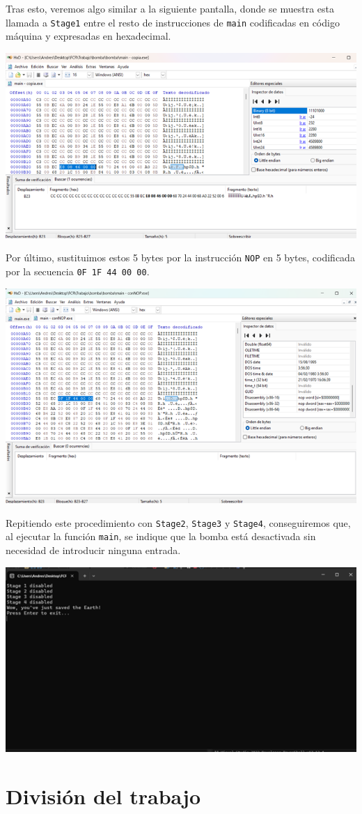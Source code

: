 \documentclass[11pt,a4paper]{article}
\begin{document}
Tras esto, veremos algo similar a la siguiente pantalla, donde se muestra
esta llamada a \texttt{Stage1} entre el resto de instrucciones de \texttt{main}
codificadas en código máquina y expresadas en hexadecimal.
\begin{center}
  \includegraphics[width=\textwidth]{Modificacion/img3.png}
\end{center}

\noindent Por último, sustituimos estos 5 bytes por la instrucción \texttt{NOP}
en 5 bytes, codificada por la secuencia \texttt{0F 1F 44 00 00}.
\begin{center}
  \includegraphics[width=\textwidth]{Modificacion/img4.png}
\end{center}

Repitiendo este procedimiento con \texttt{Stage2}, \texttt{Stage3} y \texttt{Stage4},
conseguiremos que, al ejecutar la función \texttt{main}, se indique que la bomba está
desactivada sin necesidad de introducir ninguna entrada.
\begin{center}
  \includegraphics[width=\textwidth]{Modificacion/img5.png}
\end{center}
\newpage

\section{División del trabajo}
\end{document}
